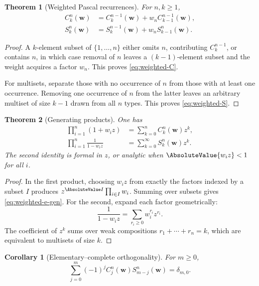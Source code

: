 \documentclass[11pt,a4paper,oneside,openany]{book}
\newtheorem{theorem}{Theorem}[chapter]
\newtheorem{corollary}[corollary]{Corollary}
\theoremstyle{definition}
\theoremstyle{remark}
\begin{document}
\begin{theorem}[Weighted Pascal recurrences]\label{thm:weighted-pascal}
For $n,k\ge1$,
\begin{align}
 C_k^n(\mathbf w)&=C_k^{n-1}(\mathbf w)+w_nC_{k-1}^{n-1}(\mathbf w),\label{eq:weighted-C}\\
 S_k^n(\mathbf w)&=S_k^{n-1}(\mathbf w)+w_nS_{k-1}^{n}(\mathbf w).\label{eq:weighted-S}
\end{align}
\end{theorem}

\begin{proof}
A $k$-element subset of $\{1,\dots,n\}$ either omits $n$, contributing $C_k^{n-1}$, or contains $n$, in which case removal of $n$ leaves a $(k-1)$-element subset and the weight acquires a factor $w_n$.  This proves \eqref{eq:weighted-C}.

For multisets, separate those with no occurrence of $n$ from those with at least one occurrence.  Removing one occurrence of $n$ from the latter leaves an arbitrary multiset of size $k-1$ drawn from all $n$ types.  This proves \eqref{eq:weighted-S}.
\end{proof}

\begin{theorem}[Generating products]\label{thm:weighted-generating}
One has
\begin{align}
 \prod_{i=1}^{n}(1+w_i z)
 &=\sum_{k=0}^{n}C_k^n(\mathbf w)z^k,\label{eq:weighted-e-gen}\\
 \prod_{i=1}^{n}\frac1{1-w_i z}
 &=\sum_{k=0}^{\infty}S_k^n(\mathbf w)z^k.\label{eq:weighted-h-gen}
\end{align}
The second identity is formal in $z$, or analytic when $\AbsoluteValue{w_i z}<1$ for all $i$.
\end{theorem}

\begin{proof}
In the first product, choosing $w_i z$ from exactly the factors indexed by a subset $I$ produces $z^{\AbsoluteValue I}\prod_{i\in I}w_i$.  Summing over subsets gives \eqref{eq:weighted-e-gen}.  For the second, expand each factor geometrically:
\[
 \frac1{1-w_i z}=\sum_{r_i\ge0}w_i^{r_i}z^{r_i}.
\]
The coefficient of $z^k$ sums over weak compositions $r_1+\cdots+r_n=k$, which are equivalent to multisets of size $k$.
\end{proof}

\begin{corollary}[Elementary--complete orthogonality]\label{cor:e-h-orthogonality}
For $m\ge0$,
\[
 \sum_{j=0}^{m}(-1)^jC_j^n(\mathbf w)S_{m-j}^n(\mathbf w)=\delta_{m,0}.
\]
\end{corollary}
\end{document}

